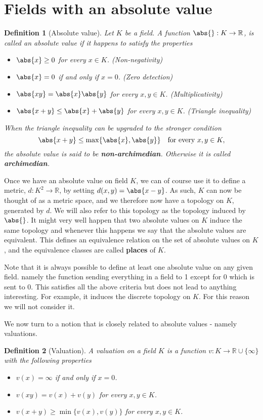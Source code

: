 \documentclass{article}
\newtheorem{definition}{Definition}[section]
\newcommand{\mbb}[1]{\mathbb{#1}}
\begin{document}
\section{Fields with an absolute value}

\begin{definition}[Absolute value]
    Let $K$ be a field. A function $\abs{} : K \to \mbb R$, is called an absolute value if it happens to satisfy the properties
    \begin{itemize}
        \item $\abs{x} \geq 0$ for every $x \in K$. (Non-negativity)
        \item $\abs{x} = 0$ if and only if $x = 0$. (Zero detection)
        \item $\abs{xy} = \abs{x} \abs{y}$ for every $x,y \in K$. (Multiplicativity)
        \item $\abs{x + y} \leq \abs{x} + \abs{y}$ for every $x,y \in K$. (Triangle inequality)
    \end{itemize}
    When the triangle inequality can be upgraded to the stronger condition $$\abs{x + y} \leq \max \{\abs{x}, \abs{y}\} \quad \text{for every } x,y \in K,$$
    the absolute value is said to be \textbf{non-archimedian}. Otherwise it is called \textbf{archimedian}.
\end{definition}
Once we have an absolute value on field $K$, we can of course use it to define a metric, $d : K^2 \to \mbb R$, by setting $d(x,y) = \abs{x - y}$. As such, $K$ can now be thought of as a metric space, and we therefore now have a topology on $K$, generated by $d$. We will also refer to this topology as the topology induced by $\abs{}$. It might very well happen that two absolute values on $K$ induce the same topology and whenever this happens we say that the absolute values are equivalent. This defines an equivalence relation on the set of absolute values on $K$, and the equivalence classes are called \textbf{places} of $K$. 

Note that it is always possible to define at least one absolute value on any given field. namely the function sending everything in a field to 1 except for 0 which is sent to 0. This satisfies all the above criteria but does not lead to anything interesting. For example, it induces the discrete topology on $K$. For this reason we will not consider it. 

We now turn to a notion that is closely related to absolute values - namely valuations. 

\begin{definition}[Valuation]
    A valuation on a field $K$ is a function $v : K \to \mbb R \cup \{\infty\}$ with the following properties 
    \begin{itemize}
        \item $v(x) = \infty$ if and only if $x = 0$.
        \item $v(xy) = v(x) + v(y)$ for every $x,y \in K$. 
        \item $v(x + y) \geq \min \{v(x), v(y)\}$ for every $x,y \in K$.
    \end{itemize}
\end{definition}
\end{document}

